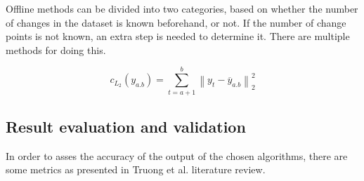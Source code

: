 Offline methods can be divided into two categories, based on whether the number of changes in the dataset is known beforehand, or not. If the number of change points is not known, an extra step is needed to determine it. There are multiple methods for doing this.




\begin{equation}
    c_{L_2}(y_{a.b}) = \sum^b_{t=a+1} \left\lVert y_t-\overline{y}_{a.b} \right\rVert ^2_2%
    \label{eq:l2}
\end{equation}


\subsection{Result evaluation and validation} \label{subsec:validation}

In order to asses the accuracy of the output of the chosen algorithms, there are some metrics as presented in Truong et al. \cite{truongSelectiveReviewOffline2020} literature review.



